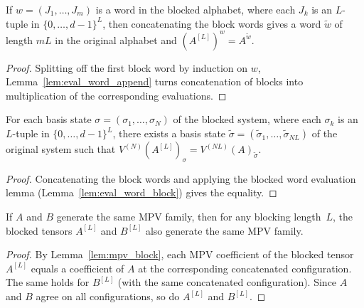 \begin{lemma}\label{lem:eval_word_block}
    \leanok
    If $w = (J_1, \ldots, J_m)$ is a word in the blocked alphabet,
    where each $J_k$ is an $L$-tuple in $\{0, \ldots, d{-}1\}^L$,
    then concatenating the block words gives a word $\widetilde{w}$
    of length $mL$ in the original alphabet and
    $(A^{[L]})^w = A^{\widetilde{w}}$.
\end{lemma}

\begin{proof}\leanok
    Splitting off the first block word by induction on $w$,
    Lemma~\ref{lem:eval_word_append} turns concatenation of blocks into
    multiplication of the corresponding evaluations.
\end{proof}

\begin{lemma}\label{lem:mpv_block}
    \leanok
    For each basis state $\sigma = (\sigma_1, \ldots, \sigma_N)$ of
    the blocked system, where each $\sigma_k$ is an $L$-tuple in
    $\{0, \ldots, d{-}1\}^L$, there exists a basis state
    $\widetilde{\sigma}
        = (\widetilde{\sigma}_1, \ldots, \widetilde{\sigma}_{NL})$
    of the original system such that
    $V^{(N)}(A^{[L]})_\sigma
        = V^{(NL)}(A)_{\widetilde{\sigma}}$.
\end{lemma}

\begin{proof}\leanok
    Concatenating the block words and applying the blocked word evaluation
    lemma (Lemma~\ref{lem:eval_word_block}) gives the equality.
\end{proof}

\begin{lemma}\label{thm:blocking_same_mpv}
    \leanok
    If $A$ and $B$ generate the same MPV family, then for any
    blocking length~$L$, the blocked tensors $A^{[L]}$ and $B^{[L]}$
    also generate the same MPV family.
\end{lemma}

\begin{proof}\leanok
    By Lemma~\ref{lem:mpv_block},
    each MPV coefficient of the blocked tensor $A^{[L]}$ equals
    a coefficient of $A$ at the corresponding concatenated
    configuration.
    The same holds for $B^{[L]}$ (with the same concatenated
    configuration).
    Since $A$ and $B$ agree on all configurations, so do
    $A^{[L]}$ and $B^{[L]}$.
\end{proof}

